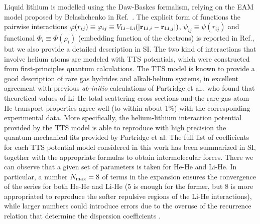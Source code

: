 \documentclass[jcp,amsmath,amssymb,preprint]{revtex4-1}
\begin{document}
Liquid lithium is modelled using the Daw-Baskes\cite{daw1983semiempirical} formalism, relying on the EAM model proposed by Belashchenko in Ref.~\cite{belashchenko2012embedded}. The explicit form of functions the pairwise interactions $\varphi(r_{ij}) \equiv \varphi_{ij} \equiv V_{{\rm Li}-{\rm Li}}(|{\bf r}_{{\rm Li},i}-{\bf r}_{{\rm Li},j}|)$, $\psi_{ij} \equiv \psi(r_{ij})$ and functional $\Phi_{i} \equiv \Phi(\rho_{i})$ (embedding function of the electrons) is reported in Ref.\cite{belashchenko2012embedded}, but we also provide a detailed description in SI. The two kind of interactions that involve helium atoms are modeled with TTS potentials\cite{sheng2020conformal,sheng2021development},  which were constructed from first-principles quantum calculations. The TTS model is known to provide a good description of rare gas hydrides and alkali-helium systems, in excellent agreement with previous {\it ab-initio} calculations of Partridge et al.\cite{partridge2001potential}, who found that theoretical values of Li–He total scattering cross sections and the rare-gas atom–He transport properties agree well (to within about 1\%) with the corresponding experimental data.  More specifically, the helium-lithium interaction potential provided by the TTS model is able to reproduce with high precision the quantum-mechanical fits provided by Partridge et al. The full list of coefficients for each TTS potential model considered in this work has been summarized in SI, together with the appropriate formulas to obtain intermolecular forces.  There we can observe that a given set of parameters is taken for He-He and Li-He.  In particular, a number $N_{\rm max}=8$ of terms in the expansion ensures the convergence of the series for both He-He and Li-He (5 is enough for the former,  but 8 is more appropriated to reproduce the softer repulsive regions of the Li-He interactions), while larger numbers could introduce errors due to the overuse of the recurrence relation that determine the dispersion coefficients \cite{sheng2021development}.  
\end{document}
